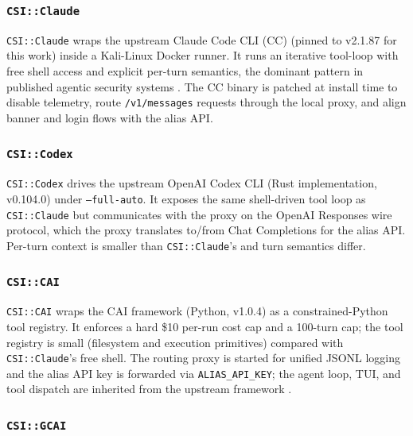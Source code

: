 \subsubsection{\textcolor{cc_color}{\texttt{CSI::Claude}}}\label{sec:cc}

\texttt{CSI::Claude} wraps the upstream Claude Code CLI (CC) \cite{anthropic2025claudecode} (pinned to v2.1.87 for this work) inside a Kali-Linux Docker runner. It runs an iterative tool-loop with free shell access and explicit per-turn semantics, the dominant pattern in published agentic security systems \cite{deng2024pentestgpt,redteamllm2025}. The CC binary is patched at install time to disable telemetry, route \texttt{/v1/messages} requests through the local proxy, and align banner and login flows with the alias API.

\subsubsection{\textcolor{codex_color}{\texttt{CSI::Codex}}}\label{sec:codex}

\texttt{CSI::Codex} drives the upstream OpenAI Codex CLI \cite{openai2025codex} (Rust implementation, v0.104.0) under \texttt{--full-auto}. It exposes the same shell-driven tool loop as \texttt{CSI::Claude} but communicates with the proxy on the OpenAI Responses wire protocol, which the proxy translates to/from Chat Completions for the alias API. Per-turn context is smaller than \texttt{CSI::Claude}'s and turn semantics differ.

\subsubsection{\textcolor{cai_orange}{\texttt{CSI::CAI}}}\label{sec:cai}

\texttt{CSI::CAI} wraps the CAI framework \cite{mayoral2025cai} (Python, v1.0.4) as a constrained-Python tool registry. It enforces a hard \$10 per-run cost cap and a 100-turn cap; the tool registry is small (filesystem and execution primitives) compared with \texttt{CSI::Claude}'s free shell. The routing proxy is started for unified JSONL logging and the alias API key is forwarded via \texttt{ALIAS\_API\_KEY}; the agent loop, TUI, and tool dispatch are inherited from the upstream framework \cite{mayoral2025offensive}.

\subsubsection{\textcolor{gcai_color}{\texttt{CSI::GCAI}}}\label{sec:gcai}

